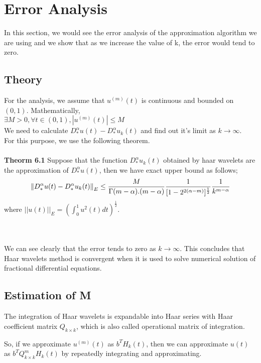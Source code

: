 \section{Error Analysis}

In this section, we would see the error analysis of the approximation algorithm we are using and we show that as we increase the value of k, the error would tend to zero.
\subsection{Theory}
For the analysis, we assume that $u^{(m)}(t)$ is continuous and bounded on $(0,1)$. Mathematically, \\
$\exists M > 0, \forall t \in (0,1), |u^{(m)}(t)| \leq M$\\
We need to calculate $D_*^\alpha u(t) - D_*^\alpha u_k(t)$ and find out it's limit as $k \rightarrow \infty$. \\ For this purpose, we use the following theorem. \\~\\

\textbf{Theorm 6.1} Suppose that the function $D_*^\alpha u_k(t)$ obtained by haar wavelets are the approximation of $D_*^\alpha u(t)$, then we have exact upper bound as follows;
\begin{equation*}
\left\lVert D_*^\alpha u(t) - D_*^\alpha u_k(t)\right\rVert_E \leq \frac{M}{\Gamma(m-\alpha).(m-\alpha)}\frac{1}{[1-2^{2(\alpha -m)}]^\frac{1}{2}} \frac{1}{k^{m-\alpha}}
\end{equation*}
where $ || u(t) ||_E = ( \int_0^1 u^2(t) dt )^{\frac{1}{2}}$.

\\~\\ We can see clearly that the error tends to zero as $k \rightarrow \infty$. This concludes that Haar wavelets method is convergent when it is used to solve numerical solution of fractional differential equations.
\\
\subsection{Estimation of M}

The integration of Haar wavelets is expandable into Haar series with Haar coefficient matrix $Q_{k \times k}$, which is also called operational matrix of integration.

So, if we approximate $u^{(m)}(t)$ as $b^TH_k(t)$, then we can approximate $u(t)$ as $b^TQ_{k \times k}^m H_k(t)$ by repeatedly integrating and approximating.


